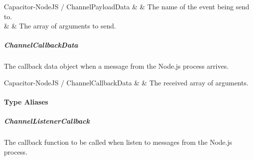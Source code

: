 \begin{interfacedesc}{Capacitor-NodeJS / ChannelPayloadData}
   &  & The name of the event being send to. \\ \hline
        &   & The array of arguments to send. \\ \hline
\end{interfacedesc}   


\subparagraph{ChannelCallbackData}

The callback data object when a message from the Node.js process arrives.

\begin{interfacedesc}{Capacitor-NodeJS / ChannelCallbackData}
   &  & The received array of arguments. \\ \hline
\end{interfacedesc}


\newpage

\paragraph{Type Aliases}


\subparagraph{ChannelListenerCallback}

The callback function to be called when listen to messages from the Node.js process.


